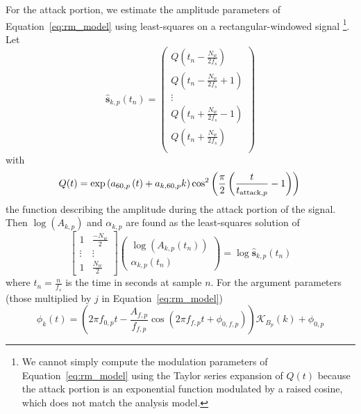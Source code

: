 For the attack portion, we estimate the amplitude parameters of
Equation~\ref{eq:rm_model} using least-squares on a rectangular-windowed
signal%
\footnote{We cannot simply compute the modulation parameters of
    Equation~\ref{eq:rm_model} using the Taylor series expansion of $Q(t)$
    because the attack portion is an exponential function modulated by a raised
    cosine, which does not match the analysis model.}. Let
\begin{equation}
    \hat{\mathbf{s}}_{k,p}(t_{n}) =
    \begin{pmatrix}
        Q(t_{n}-\frac{N_{w}}{2f_{s}}) \\
        Q(t_{n}-\frac{N_{w}}{2f_{s}}+1) \\
        \vdots \\
        Q(t_{n}+\frac{N_{w}}{2f_{s}}-1) \\
        Q(t_{n}+\frac{N_{w}}{2f_{s}}) \\
    \end{pmatrix}
\end{equation}
with
\[
    Q(t)=
        \exp \left(\displaystyle a_{60,p} \left( t \right)  +
        a_{k,60,p} k \right) \cos^{2} \left(\displaystyle \frac{\pi}{2} \left(
                \frac{ t }{ t_{\text{attack},p}} - 1 \right) \right)  \\
\]
the function describing the amplitude during the attack portion of the signal.
Then $\log(A_{k,p})$ and $\alpha_{k,p}$ are found as the least-squares solution
of
\begin{equation}
    \begin{bmatrix}
        1 & \frac{-N_{w}}{2} \\
        \vdots & \vdots \\
        1 & \frac{N_{w}}{2}
    \end{bmatrix}
    \begin{pmatrix}
        \log(A_{k,p}(t_{n})) \\
        \alpha_{k,p}(t_{n})
    \end{pmatrix}
    = \log{\hat{\mathbf{s}}_{k,p}(t_{n})}
\end{equation}
where $t_{n}=\frac{n}{f_{s}}$ is the time in seconds at sample $n$. For the
argument parameters (those multiplied by $j$ in Equation~\eqref{eq:rm_model})
\begin{equation}
    \phi_{k} \left( t \right)  =  \left( 2\pi f_{0,p}t - \frac{A_{f,p}}{f_{f,p}}
    \cos \left( 2\pi f_{f,p} t + \phi_{0,f,p} \right)  \right)  \mathcal{K}_{B_{p}} \left(
    k \right)  + \phi_{0,p}
\end{equation}
